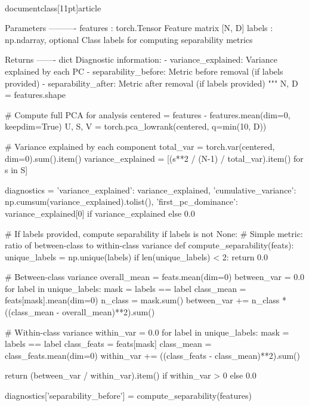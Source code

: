 \\documentclass[11pt]{article}
\begin{document}
\begin{CodeBlock}
{    Parameters
    ----------
    features : torch.Tensor
        Feature matrix [N, D]
    labels : np.ndarray, optional
        Class labels for computing separability metrics
    
    Returns
    -------
    dict
        Diagnostic information:
        - variance_explained: Variance explained by each PC
        - separability_before: Metric before removal (if labels provided)
        - separability_after: Metric after removal (if labels provided)
    """
    N, D = features.shape
    
    # Compute full PCA for analysis
    centered = features - features.mean(dim=0, keepdim=True)
    U, S, V = torch.pca_lowrank(centered, q=min(10, D))
    
    # Variance explained by each component
    total_var = torch.var(centered, dim=0).sum().item()
    variance_explained = [(s**2 / (N-1) / total_var).item() for s in S]
    
    diagnostics = {
        'variance_explained': variance_explained,
        'cumulative_variance': np.cumsum(variance_explained).tolist(),
        'first_pc_dominance': variance_explained[0] if variance_explained else 0.0
    }
    
    # If labels provided, compute separability
    if labels is not None:
        # Simple metric: ratio of between-class to within-class variance
        def compute_separability(feats):
            unique_labels = np.unique(labels)
            if len(unique_labels) < 2:
                return 0.0
            
            # Between-class variance
            overall_mean = feats.mean(dim=0)
            between_var = 0.0
            for label in unique_labels:
                mask = labels == label
                class_mean = feats[mask].mean(dim=0)
                n_class = mask.sum()
                between_var += n_class * ((class_mean - overall_mean)**2).sum()
            
            # Within-class variance
            within_var = 0.0
            for label in unique_labels:
                mask = labels == label
                class_feats = feats[mask]
                class_mean = class_feats.mean(dim=0)
                within_var += ((class_feats - class_mean)**2).sum()
            
            return (between_var / within_var).item() if within_var > 0 else 0.0
        
        diagnostics['separability_before'] = compute_separability(features)
        
}
\end{CodeBlock}
\end{document}
